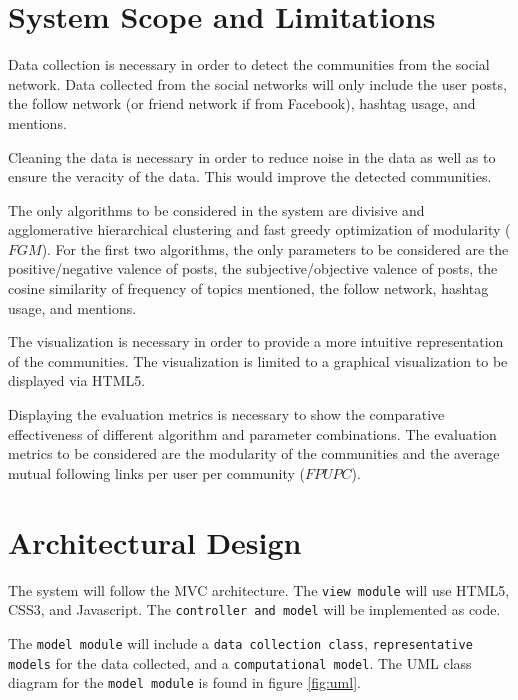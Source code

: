 \section{System Scope and Limitations}
Data collection is necessary in order to detect the communities from the social network.
Data collected from the social networks will only include the user posts, the follow network (or friend network if from Facebook),
hashtag usage, and mentions.




Cleaning the data is necessary in order to reduce noise in the data as well as to ensure the veracity of the data. This 
would improve the detected communities.




The only algorithms to be considered in the system are divisive and agglomerative hierarchical clustering and fast greedy optimization
of modularity ($FGM$). For the first two algorithms, the only parameters to be considered are the positive/negative valence of posts, 
the subjective/objective valence of posts, the cosine similarity of frequency of topics mentioned, the follow network, hashtag usage,
and mentions.




The visualization is necessary in order to provide a more intuitive representation of the communities. The visualization is limited to 
a graphical visualization to be displayed via HTML5.




Displaying the evaluation metrics is necessary to show the comparative effectiveness of different algorithm and parameter combinations.
The evaluation metrics to be considered are the modularity of the communities and the average mutual following links per user per community
($FPUPC$).








\section{Architectural Design}
The system will follow the MVC architecture. The \texttt{view module} will use HTML5, CSS3, and Javascript. The 
\texttt{controller and model} will be implemented as code.




The \texttt{model module} will include a \texttt{data collection class}, \texttt{representative models} for the data collected, and a \texttt{computational model}.
The UML class diagram for the \texttt{model module} is found in figure \ref{fig:uml}.




